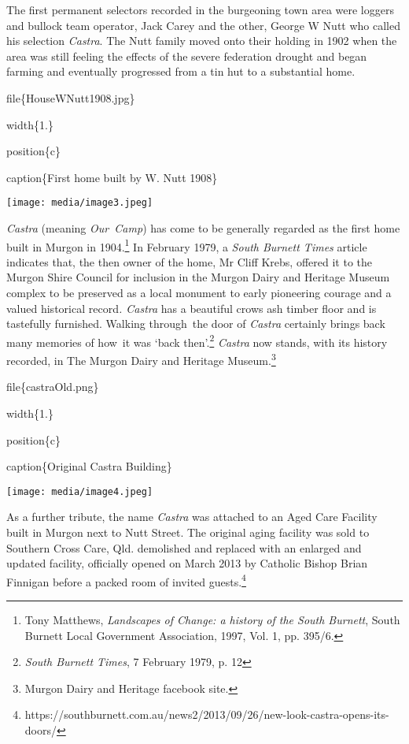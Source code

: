 The first permanent selectors recorded in the burgeoning town area were loggers and bullock team operator, Jack Carey and the other, George W Nutt who called his selection \emph{Castra}. The Nutt family moved onto their holding in 1902 when the area was still feeling the effects of the severe federation drought and began farming and eventually progressed from a tin hut to a substantial home.

file\{HouseWNutt1908.jpg\}

width\{1.\}

position\{c\}

caption\{First home built by W. Nutt 1908\}

\texttt{[image: media/image3.jpeg]}

\emph{Castra} (meaning \emph{Our~Camp}) has come to be generally regarded as the first home built in Murgon in 1904.\footnote{Tony Matthews, \emph{Landscapes of Change: a history of the South Burnett}, South Burnett Local Government Association, 1997, Vol. 1, pp. 395/6.} In February 1979, a \emph{South Burnett Times} article indicates that, the then owner of the home, Mr Cliff Krebs, offered it to the Murgon Shire Council for inclusion in the Murgon Dairy and Heritage Museum complex to be preserved as a local monument to early pioneering courage and a valued historical record\emph{. Castra} has a beautiful crows ash timber floor and is tastefully furnished. Walking through~the door of \emph{Castra} certainly brings back many memories of how~it was `back then'.\footnote{\emph{South Burnett Times}, 7 February 1979, p. 12} \emph{Castra} now stands, with its history recorded, in The Murgon Dairy and Heritage Museum.\footnote{Murgon Dairy and Heritage facebook site.}

file\{castraOld.png\}

width\{1.\}

position\{c\}

caption\{Original Castra Building\}

\texttt{[image: media/image4.jpeg]}

As a further tribute, the name \emph{Castra} was attached to an Aged Care Facility built in Murgon next to Nutt Street. The original aging facility was sold to Southern Cross Care, Qld. demolished and replaced with an enlarged and updated facility, officially opened on March 2013 by Catholic Bishop Brian Finnigan before a packed room of invited guests.\footnote{https://southburnett.com.au/news2/2013/09/26/new-look-castra-opens-its-doors/}


